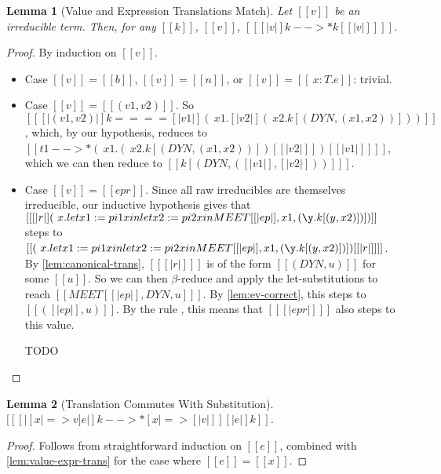 \documentclass[11pt]{article}
\newtheorem{lemma}{Lemma}[section]
\newcommand{\rrule}[1]{\rref*{#1}}
\begin{document}
\begin{lemma}[Value and Expression Translations Match]
	\label{lem:value-expr-trans}
	Let $[[v]]$ be an irreducible term. Then, for any $[[k]]$, $[[v]]$, $[[ [|v|]k -->* k [ [|v|] ]  ]]$.
\end{lemma}
\begin{proof}
	By induction on $[[v]]$. 

	\begin{itemize}
		\item Case $[[v]] = [[b]]$, $[[v]] = [[n]]$, or $[[v]] = [[\ x : T . e]]$: trivial.
		\item Case $[[v]] = [[(v1, v2)]]$.
		      So $[[ [|(v1, v2)|]k ==== [| v1 |](\ x1 . [|v2|](\ x2 . k[(DYN, (x1, x2))] ) )  ]]$,
		      which, by our hypothesis, reduces to  $[[t1 -->* (\ x1 . (\ x2 . k[(DYN, (x1, x2))] )[ [|v2|] ] )[ [|v1|] ] ]]$,
		      which we can then reduce to $[[k[(DYN, ([|v1|],[|v2|]))] ]]$.
		\item Case $[[v]] = [[ep r]]$. Since all raw irreducibles are themselves irreducible,
		      our inductive hypothesis gives that
		      $[[ [|r|] (\ x . let x1 := pi1 x in let x2 := pi2 x in MEET [ [|ep|],x1, (\y . k [(y,x2)]) ] )]]$
		      steps to $[[(\ x . let x1 := pi1 x in let x2 := pi2 x in MEET [ [|ep|],x1, (\y . k [(y,x2)]) ] )[ [|r|] ] ]]$.
		      By \autoref{lem:canonical-trans}, $[[ [|r|] ]]$ is of the form
		      $[[(DYN, u)]]$ for some $[[u]]$.
		      So we can then $\beta$-reduce and apply the let-substitutions to reach $[[ MEET[ [|ep|], DYN, u ]  ]]$.
		      By \autoref{lem:ev-correct}, this steps to $[[([|ep|], u)]]$.
		      By the rule \rrule{TransformEv}, this means that $[[ [|ep r|] ]]$ also steps to this value.


		      TODO 
	\end{itemize}
\end{proof}

\begin{lemma}[Translation Commutes With Substitution]
	\label{lem:subst-commut}
	$[[ [|[x |=> v]e|]k -->* [x |=> [|v|] ][|e|]k   ]]$. 
\end{lemma}
\begin{proof}
	Follows from straightforward induction on $[[e]]$, combined with \autoref{lem:value-expr-trans}
	for the case where $[[e]]=[[x]]$.
\end{proof}
\end{document}
